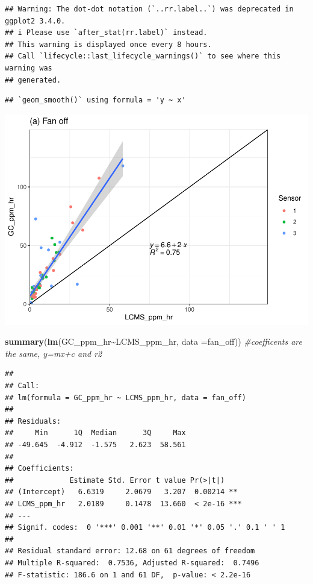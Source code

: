 \documentclass[
]{article}
\newenvironment{Shaded}{\begin{snugshade}}{\end{snugshade}}
\newcommand{\AttributeTok}[1]{\textcolor[rgb]{0.13,0.29,0.53}{#1}}
\newcommand{\CommentTok}[1]{\textcolor[rgb]{0.56,0.35,0.01}{\textit{#1}}}
\newcommand{\FunctionTok}[1]{\textcolor[rgb]{0.13,0.29,0.53}{\textbf{#1}}}
\newcommand{\NormalTok}[1]{#1}
\newcommand{\SpecialCharTok}[1]{\textcolor[rgb]{0.81,0.36,0.00}{\textbf{#1}}}
\begin{document}
\begin{verbatim}
## Warning: The dot-dot notation (`..rr.label..`) was deprecated in ggplot2 3.4.0.
## i Please use `after_stat(rr.label)` instead.
## This warning is displayed once every 8 hours.
## Call `lifecycle::last_lifecycle_warnings()` to see where this warning was
## generated.
\end{verbatim}

\begin{verbatim}
## `geom_smooth()` using formula = 'y ~ x'
\end{verbatim}

\includegraphics{Initial_look_GC_LCMS_files/figure-latex/unnamed-chunk-3-1.pdf}

\begin{Shaded}
\begin{Highlighting}[]
\FunctionTok{summary}\NormalTok{(}\FunctionTok{lm}\NormalTok{(GC\_ppm\_hr}\SpecialCharTok{\textasciitilde{}}\NormalTok{LCMS\_ppm\_hr, }\AttributeTok{data =}\NormalTok{fan\_off)) }\CommentTok{\#coefficents are the same, y=mx+c and r2}
\end{Highlighting}
\end{Shaded}

\begin{verbatim}
## 
## Call:
## lm(formula = GC_ppm_hr ~ LCMS_ppm_hr, data = fan_off)
## 
## Residuals:
##     Min      1Q  Median      3Q     Max 
## -49.645  -4.912  -1.575   2.623  58.561 
## 
## Coefficients:
##             Estimate Std. Error t value Pr(>|t|)    
## (Intercept)   6.6319     2.0679   3.207  0.00214 ** 
## LCMS_ppm_hr   2.0189     0.1478  13.660  < 2e-16 ***
## ---
## Signif. codes:  0 '***' 0.001 '**' 0.01 '*' 0.05 '.' 0.1 ' ' 1
## 
## Residual standard error: 12.68 on 61 degrees of freedom
## Multiple R-squared:  0.7536, Adjusted R-squared:  0.7496 
## F-statistic: 186.6 on 1 and 61 DF,  p-value: < 2.2e-16
\end{verbatim}
\end{document}
